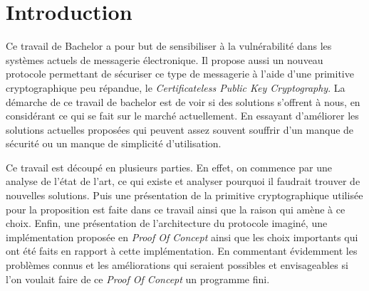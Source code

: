 \chapter{Introduction}
\label{ch:intro}

Ce travail de Bachelor a pour but de sensibiliser à la vulnérabilité dans les systèmes actuels de messagerie électronique. Il propose aussi un nouveau protocole permettant de sécuriser ce type de messagerie à l'aide d'une primitive cryptographique peu répandue, le \textit{Certificateless Public Key Cryptography}. La démarche de ce travail de bachelor est de voir si des solutions s'offrent à nous, en considérant ce qui se fait sur le marché actuellement. En essayant d'améliorer les solutions actuelles proposées qui peuvent assez souvent souffrir d'un manque de sécurité ou un manque de simplicité d'utilisation.

Ce travail est découpé en plusieurs parties. En effet, on commence par une analyse de l'état de l'art, ce qui existe et analyser pourquoi il faudrait trouver de nouvelles solutions. Puis une présentation de la primitive cryptographique utilisée pour la proposition est faite dans ce travail ainsi que la raison qui amène à ce choix. Enfin, une présentation de l'architecture du protocole imaginé, une implémentation proposée en \textit{Proof Of Concept} ainsi que les choix importants qui ont été faits en rapport à cette implémentation. En commentant évidemment les problèmes connus et les améliorations qui seraient possibles et envisageables si l'on voulait faire de ce \textit{Proof Of Concept} un programme fini.